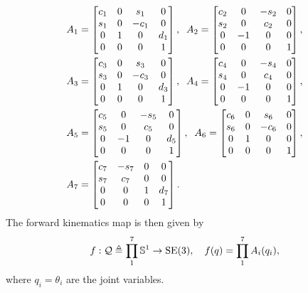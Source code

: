 \begin{align}
  \begin{split}
    A_1 &= \begin{bmatrix} c_1 & 0 & s_1 & 0 \\ s_1 & 0 & -c_1 & 0 \\ 0 & 1 & 0 & d_1 \\ 0 & 0 & 0 & 1\end{bmatrix}, \;\;
    A_2 = \begin{bmatrix} c_2 & 0 & -s_2 & 0 \\ s_2 & 0 & c_2 & 0 \\ 0 & -1 & 0 & 0 \\ 0 & 0 & 0 & 1\end{bmatrix}, \\
    A_3 &= \begin{bmatrix} c_3 & 0 & s_3 & 0 \\ s_3 & 0 & -c_3 & 0 \\ 0 & 1 & 0 & d_3 \\ 0 & 0 & 0 & 1\end{bmatrix}, \;\;
    A_4 = \begin{bmatrix} c_4 & 0 & -s_4 & 0 \\ s_4 & 0 & c_4 & 0 \\ 0 & -1 & 0 & 0 \\ 0 & 0 & 0 & 1\end{bmatrix}, \\
    A_5 &= \begin{bmatrix} c_5 & 0 & -s_5 & 0 \\ s_5 & 0 & c_5 & 0 \\ 0 & -1 & 0 & d_5 \\ 0 & 0 & 0 & 1\end{bmatrix}, \;\;
    A_6 = \begin{bmatrix} c_6 & 0 & s_6 & 0 \\ s_6 & 0 & -c_6 & 0 \\ 0 & 1 & 0 & 0 \\ 0 & 0 & 0 & 1\end{bmatrix}, \\
    A_7 &= \begin{bmatrix} c_7 & -s_7 & 0 & 0 \\ s_7 & c_7 & 0 & 0 \\ 0 & 0 & 1 & d_7 \\ 0 & 0 & 0 & 1\end{bmatrix}. \\
  \end{split}
\end{align}
%
The forward kinematics map is then given by \[ f: \mathcal{Q} \triangleq \prod_1^7
\mathbb{S}^1 \rightarrow \mathrm{SE}(3), \quad f(q) = \prod_1^7 A_i(q_i), \]
%
where $q_i = \theta_i$ are the joint variables.

